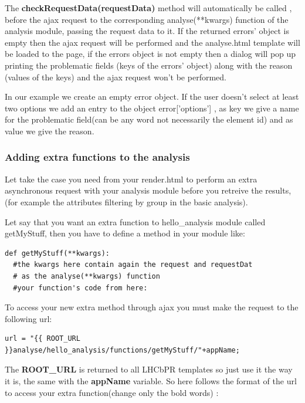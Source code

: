 \documentclass{lhcbnote}
\begin{document}
The {\bf checkRequestData(requestData)} method will automatically be called , before the ajax request to the corresponding analyse(**kwargs) function of the analysis module, 
 passing the request data to it. If the returned errors' object is empty then the ajax request will be performed and the analyse.html template will be loaded to the page, if the 
errors object is not empty then a dialog will pop up printing the problematic fields (keys of the errors' object) along with the reason (values of the keys) and the ajax request 
won't be performed. 

In our example we create an empty error object.
If the user doesn't select at least two options we add an entry to the object error['options'] , as key we give a name for the problematic field(can be any word not necessarily the element id) and as
value we give the reason.

\subsubsection{Adding extra functions to the analysis}

Let take the case you need from your render.html to perform an extra asynchronous request with your analysis module before you retreive the results,
(for example the attributes filtering by group in the basic analysis). 

Let say that you want an extra function to hello\_analysis module called getMyStuff, then you have to define a method in your module like:

\begin{verbatim}
def getMyStuff(**kwargs):
  #the kwargs here contain again the request and requestDat
  # as the analyse(**kwargs) function
  #your function's code from here:
\end{verbatim}

To access your new extra method through ajax you must make the request to the following url:

\begin{verbatim}
url = "{{ ROOT_URL }}analyse/hello_analysis/functions/getMyStuff/"+appName;
\end{verbatim}
The {\bf ROOT\_URL} is returned to all LHCbPR templates so just use it the way it is, the same with the {\bf appName} variable.
So here follows the format of the url to access your extra function(change only the bold words) :

\vspace{2 mm}
\end{document}
